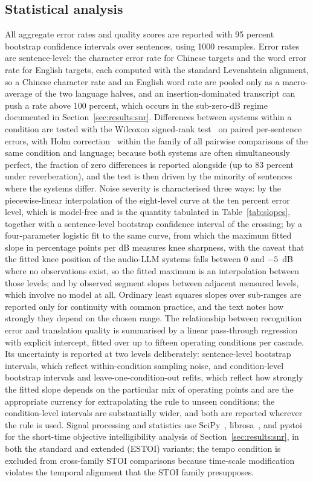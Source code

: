 \subsection{Statistical analysis}

All aggregate error rates and quality scores are reported with 95 percent
bootstrap confidence intervals over sentences, using 1000 resamples. Error
rates are sentence-level: the character error rate for Chinese targets and
the word error rate for English targets, each computed with the standard
Levenshtein alignment, so a Chinese character rate and an English word rate
are pooled only as a macro-average of the two language halves, and an
insertion-dominated transcript can push a rate above 100 percent, which
occurs in the sub-zero-dB regime documented in
Section~\ref{sec:results:snr}. Differences between systems within a
condition are tested with the Wilcoxon signed-rank test~\citep{wilcoxon1945individual}
on paired per-sentence errors, with Holm correction~\citep{holm1979simple}
within the family of all pairwise comparisons of the same condition and
language; because both systems are often simultaneously perfect, the
fraction of zero differences is reported alongside (up to 83 percent under
reverberation), and the test is then driven by the minority of sentences
where the systems differ. Noise severity is characterised three ways: by
the piecewise-linear interpolation of the eight-level curve at the ten
percent error level, which is model-free and is the quantity tabulated in
Table~\ref{tab:slopes}, together with a sentence-level bootstrap
confidence interval of the crossing; by a four-parameter logistic fit to
the same curve, from which the maximum fitted slope in percentage points
per dB measures knee sharpness, with the caveat that the fitted knee
position of the audio-LLM systems falls between 0 and $-5$~dB where no
observations exist, so the fitted maximum is an interpolation between
those levels; and by observed segment slopes between adjacent measured
levels, which involve no model at all. Ordinary least squares slopes over
sub-ranges are reported only for continuity with common practice, and the
text notes how strongly they depend on the chosen range. The relationship
between recognition error and translation quality is summarised by a
linear pass-through regression with explicit intercept, fitted over up to
fifteen operating conditions per cascade. Its uncertainty is reported at
two levels deliberately: sentence-level bootstrap intervals, which reflect
within-condition sampling noise, and condition-level bootstrap intervals
and leave-one-condition-out refits, which reflect how strongly the fitted
slope depends on the particular mix of operating points and are the
appropriate currency for extrapolating the rule to unseen conditions; the
condition-level intervals are substantially wider, and both are reported
wherever the rule is used. Signal processing and statistics use
SciPy~\citep{virtanen2020scipy}, librosa~\citep{mcfee2015librosa}, and
pystoi for the short-time objective intelligibility analysis of
Section~\ref{sec:results:snr}, in both the standard and extended (ESTOI)
variants; the tempo condition is excluded from cross-family STOI
comparisons because time-scale modification violates the temporal
alignment that the STOI family presupposes.
